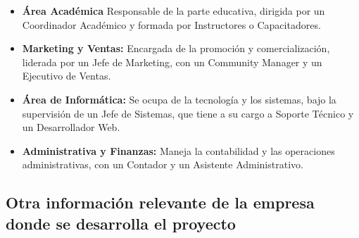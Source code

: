 \begin{itemize}
	\item \textbf{Área Académica} Responsable de la parte educativa, dirigida por un Coordinador Académico y formada por Instructores o Capacitadores.
	\item \textbf{Marketing y Ventas:} Encargada de la promoción y comercialización, liderada por un Jefe de Marketing, con un Community Manager y un Ejecutivo de Ventas.
	\item \textbf{Área de Informática:} Se ocupa de la tecnología y los sistemas, bajo la supervisión de un Jefe de Sistemas, que tiene a su cargo a Soporte Técnico y un Desarrollador Web.
	
	\item \textbf{Administrativa y Finanzas:} Maneja la contabilidad y las operaciones administrativas, con un Contador y un Asistente Administrativo.
	
	
\end{itemize}


\subsection{Otra información relevante de la empresa donde se desarrolla el proyecto}

